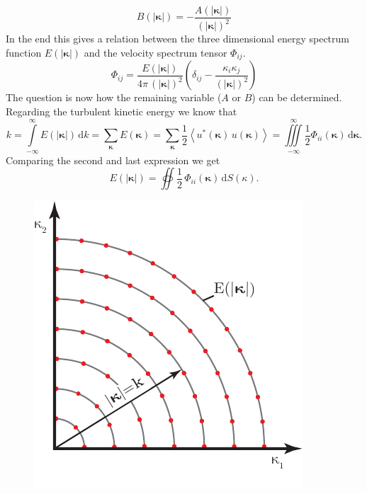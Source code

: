 \documentclass[preprint,12pt,ntfdMod]{elsarticle}
\begin{document}
\begin{par}
\begin{equation}
      \label{eq:rel_AB}
  	B(|\boldsymbol\kappa|)=-\frac{A(|\boldsymbol\kappa|)}{(|\boldsymbol\kappa|)^2}
  \end{equation}
In the end this gives a relation between the three dimensional energy spectrum
function $E(|\boldsymbol\kappa|)$ and the velocity spectrum tensor $\Phi_{ij}$.
  \begin{equation}
  	\Phi_{ij}=\frac{E(|\boldsymbol\kappa|)}{4\pi\,(|\boldsymbol\kappa|)^2}\left(\delta_{ij}
  	-\frac{\kappa_i\kappa_j}{(|\boldsymbol\kappa|)^2}\right)
  \end{equation}
The question is now how the remaining variable ($A$ or $B$) can be determined. Regarding the turbulent kinetic
energy we know that
  \begin{equation}
      \label{eq:exp_for_k}
      k=\int\limits_{-\infty}^{\infty}E(|\boldsymbol\kappa|)\,\mathrm{d}k
      =\sum\limits_{\boldsymbol\kappa}E(\boldsymbol\kappa)
      =\sum\limits_{\boldsymbol\kappa}\frac{1}{2}\left<u^{*}(\boldsymbol\kappa)\,u(\boldsymbol\kappa)\right>
      =\iiint\limits_{-\infty}^{\infty}\frac{1}{2}\Phi_{ii}(\boldsymbol\kappa)\,\mathrm{d}\boldsymbol\kappa.
  \end{equation}
Comparing the second and last expression we get
  \begin{equation}
      E(|\boldsymbol\kappa|)=\oiint\frac{1}{2}\,\Phi_{ii}(\boldsymbol\kappa)\,\mathrm{d}S(\kappa).
  \end{equation}
  \begin{figure}[t!]
      \centering
      \includegraphics[scale=1]{shell_integration}

\end{figure}
\end{par}
\end{document}
